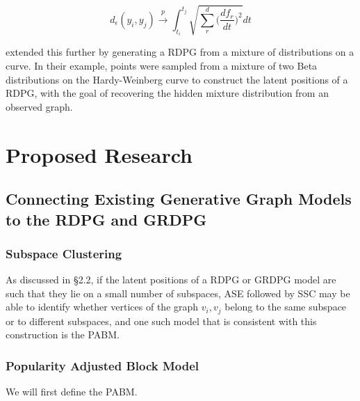 \documentclass[
  11pt,
]{article}
\begin{document}
\begin{equation}
d_{\epsilon}(y_i, y_j) \stackrel{p}{\to} \int_{t_i}^{t_j} \sqrt{\sum_r^d \Big( \frac{d f_r}{d t} \Big)^2} dt
\end{equation}

\citet{athreya2020estimation} extended this further by generating a RDPG
from a mixture of distributions on a curve. In their example, points
were sampled from a mixture of two Beta distributions on the
Hardy-Weinberg curve to construct the latent positions of a RDPG, with
the goal of recovering the hidden mixture distribution from an observed
graph.

\hypertarget{proposed-research}{%
\section{Proposed Research}\label{proposed-research}}

\hypertarget{connecting-existing-generative-graph-models-to-the-rdpg-and-grdpg}{%
\subsection{Connecting Existing Generative Graph Models to the RDPG and
GRDPG}\label{connecting-existing-generative-graph-models-to-the-rdpg-and-grdpg}}

\hypertarget{subspace-clustering-1}{%
\subsubsection{Subspace Clustering}\label{subspace-clustering-1}}

As discussed in \S 2.2, if the latent positions of a RDPG or GRDPG model
are such that they lie on a small number of subspaces, ASE followed by
SSC may be able to identify whether vertices of the graph \(v_i, v_j\)
belong to the same subspace or to different subspaces, and one such
model that is consistent with this construction is the PABM.

\hypertarget{popularity-adjusted-block-model}{%
\subsubsection{Popularity Adjusted Block
Model}\label{popularity-adjusted-block-model}}

We will first define the PABM.
\end{document}

